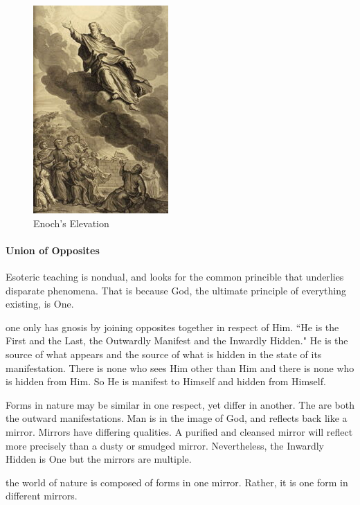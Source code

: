 \begin{figure}
 \includegraphics[scale=.5]{a20210529EnochsElevationtoHeaven-img001.jpg} 
 \caption{Enoch's Elevation}
\end{figure}

\paragraph{Union of Opposites}
Esoteric teaching is nondual, and looks for the common princible that underlies disparate phenomena. That is because God, the ultimate principle of everything existing, is One.

\begin{quotex}
one only has gnosis by joining opposites together in respect of Him. ``He is the First and the Last, the Outwardly Manifest and the Inwardly Hidden." He is the source of what appears and the source of what is hidden in the state of its manifestation. There is none who sees Him other than Him and there is none who is hidden from Him. So He is manifest to Himself and hidden from Himself.

\end{quotex}
Forms in nature may be similar in one respect, yet differ in another. The are both the outward manifestations. Man is in the image of God, and reflects back like a mirror. Mirrors have differing qualities. A purified and cleansed mirror will reflect more precisely than a dusty or smudged mirror. Nevertheless, the Inwardly Hidden is One but the mirrors are multiple.

\begin{quotex}
the world of nature is composed of forms in one mirror. Rather, it is one form in different mirrors.

\end{quotex}
